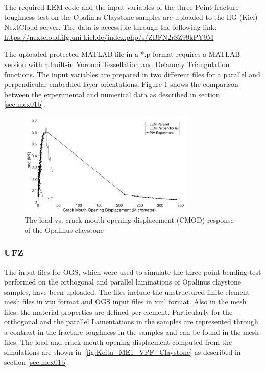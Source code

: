 The required LEM code and the input variables of the three-Point fracture toughness test on the Opalinus Claystone samples are uploaded to the IfG (Kiel) NextCloud server. The data is accessible through the following link:\\
\url{https://nextcloud.ifg.uni-kiel.de/index.php/s/ZBFN2rSZ99kPY9M}

The uploaded protected MATLAB file in a *.p format requires a MATLAB version with a built-in Voronoi Tessellation and Delaunay Triangulation functions. The input variables are prepared in two different files for a parallel and perpendicular embedded layer orientations. Figure \ref{fig:Amir_ME1_LEM_Claystone_Data} shows the comparison between the experimental and numerical data as described in section \ref {sec:mex01b}.

\begin{figure}[!ht]
\centering
\includegraphics[width=0.75\textwidth]{figures/Amir_ME1_LEM_Claystone_Data.png}
\caption{The load vs. crack mouth opening displacement (CMOD) response of the Opalinus claystone}
\label{fig:Amir_ME1_LEM_Claystone_Data}
\end{figure}

\subsubsection*{UFZ}
The input files for OGS, which were used to simulate the three point bending test performed on the orthogonal and parallel laminations of Opalinus claystone samples, have been uploaded.
The files include the unstructured finite element mesh files in vtu format and OGS input files in xml format.
Also in the mesh files, the material properties are defined per element. 
Particularly for the orthogonal and the parallel Lamentations in the samples are represented through a contrast in the fracture toughness in the samples and can be found in the mesh files.
The load and crack mouth opening displacment computed from the simulations are shown in~\ref{fig:Keita_ME1_VPF_Claystone} as described in section \ref {sec:mex01b}.

